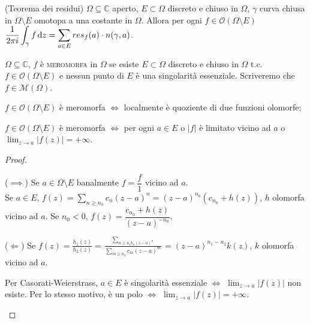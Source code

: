 \begin{thm}
  (Teorema dei residui) $\Omega \subseteq \mathbb{C}$ aperto, $E \subset \Omega$ discreto e chiuso in $\Omega$, $\gamma$ curva chiusa in $\Omega \setminus E$ omotopa a una costante in $\Omega$.
  Allora per ogni $f \in \mathcal{O}(\Omega \setminus E)$ $\displaystyle \frac{1}{2\pi i} \int_{\gamma} f \mathop{}\!\mathrm{d} z=\sum_{a \in E} res_f(a) \cdot n(\gamma, a)$.
\end{thm}

\begin{defn}
  $\Omega \subseteq \mathbb{C}$, $f$ è \textsc{meromorfa} in $\Omega$ se esiste $E \subset \Omega$ discreto e chiuso in $\Omega$ t.c. $f \in \mathcal{O}(\Omega \setminus E)$ e nessun punto di $E$ è una singolarità essenziale. Scriveremo che $f \in \mathcal{M}(\Omega)$.
\end{defn}

\begin{prop}
  \begin{nlist}
    \item $f \in \mathcal{O}(\Omega \setminus E)$ è meromorfa $\iff$ localmente è quoziente di due funzioni olomorfe;
    \item $f \in \mathcal{O}(\Omega \setminus E)$ è meromorfa $\iff$ per ogni $a \in E$ o $|f|$ è limitato vicino ad $a$ o $\displaystyle \lim_{z \rightarrow a} |f(z)|=+\infty$.
  \end{nlist}
\end{prop}

\begin{proof}
  \begin{nlist}
    \item ($\implies$) Se $a \in \Omega \setminus E$ banalmente $f=\dfrac{f}{1}$ vicino ad $a$. \\
    Se $a \in E$, $\displaystyle f(z)=\sum_{n \ge n_0} c_n(z-a)^n=(z-a)^{n_0}(c_{n_0}+h(z))$, $h$ olomorfa vicino ad $a$. Se $n_0<0$, $f(z)=\dfrac{c_{n_0}+h(z)}{(z-a)^{-n_0}}$.

    ($\Leftarrow$) Se $\displaystyle f(z)=\frac{h_1(z)}{h_2(z)}=\frac{\sum_{n \ge n_1 b_n(z-a)^n}}{\sum_{m \ge n_2} c_m(z-a)^m}=(z-a)^{n_1-n_2}k(z)$, $k$ olomorfa vicino ad $a$.
    \item Per Casorati-Weierstrass, $a \in E$ è singolarità essenziale $\iff$ $\displaystyle \lim_{z \rightarrow a} |f(z)|$ non esiste. Per lo stesso motivo, è un polo $\iff$ $\displaystyle \lim_{z \rightarrow a} |f(z)|=+\infty$.
  \end{nlist}
\end{proof}


